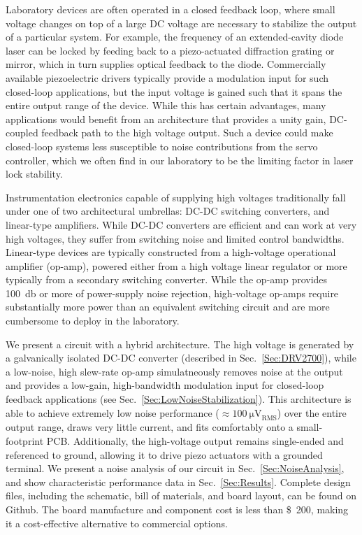 \documentclass[aip,rsi,reprint]{revtex4-1} %
\begin{document}
Laboratory devices are often operated in a closed feedback loop, where small voltage changes on top of a large DC voltage are necessary to stabilize the output of a particular system.
For example, the frequency of an extended-cavity diode laser can be locked by feeding back to a piezo-actuated diffraction grating or mirror, which in turn supplies optical feedback to the diode.
Commercially available piezoelectric drivers typically provide a modulation input for  such closed-loop applications, but the input voltage is gained such that it spans the entire output range of the device.
While this has certain advantages, many applications would benefit from an architecture that provides a unity gain, DC-coupled feedback path to the high voltage output. 
Such a device could make closed-loop systems less susceptible to noise contributions from the servo controller, which we often find in our laboratory to be the limiting factor in laser lock stability.

Instrumentation electronics capable of supplying high voltages traditionally fall under one of two architectural umbrellas: DC-DC switching converters, and linear-type amplifiers.
While DC-DC converters are efficient and can work at very high voltages, they suffer from switching noise and limited control bandwidths.
Linear-type devices are typically constructed from a high-voltage operational amplifier (op-amp), powered either from a high voltage linear regulator or more typically from a secondary switching converter.
While the op-amp provides \SI{100}{\decibel} or more of power-supply noise rejection, high-voltage op-amps require substantially more power than an equivalent switching circuit and are more cumbersome to deploy in the laboratory.

We present a circuit with a hybrid architecture.
The high voltage is generated by a galvanically isolated DC-DC converter (described in Sec.~\ref{Sec:DRV2700}), while a low-noise, high slew-rate op-amp simulatneously removes noise at the output and provides a low-gain, high-bandwidth modulation input for closed-loop feedback applications  (see Sec.~\ref{Sec:LowNoiseStabilization}).
This architecture is able to achieve extremely low noise performance ($\approx\SI{100}{\micro\volt}_{\text{RMS}}$) over the entire output range, draws very little current, and fits comfortably onto a small-footprint PCB.
Additionally, the high-voltage output remains single-ended and referenced to ground, allowing it to drive piezo actuators with a grounded terminal.
We present a noise analysis of our circuit in Sec.~\ref{Sec:NoiseAnalysis}, and show characteristic performance data in Sec.~\ref{Sec:Results}.
Complete design files, including the schematic, bill of materials, and board layout, can be found on Github\cite{PiezoDesignFiles}.
The board manufacture and component cost is less than \SI{200}[\$]{}, making it a cost-effective alternative to commercial options. 
\end{document}
